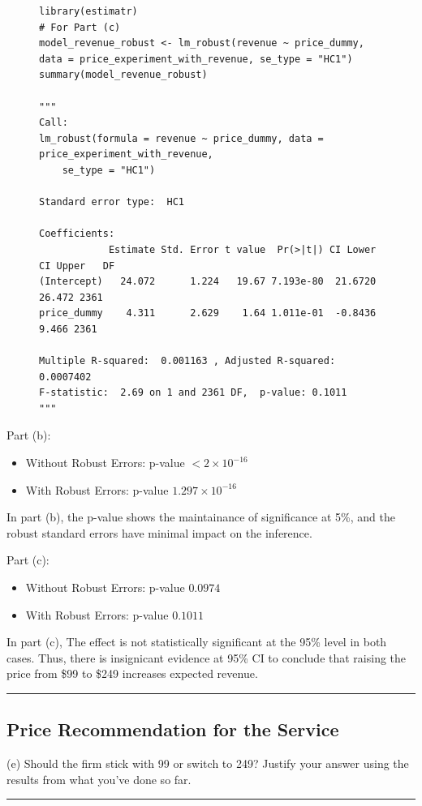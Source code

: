\documentclass{article}
\newenvironment{colorparagraph}[1]{\par\color{#1}}{\par}
\begin{document}
\begin{figure}[H]
\centering
\begin{lstlisting}[style=Rstyle, caption=Simple Revenue Dummy Regression on Price Experiment with Robust Errors]
    library(estimatr)
# For Part (c)
model_revenue_robust <- lm_robust(revenue ~ price_dummy, data = price_experiment_with_revenue, se_type = "HC1")
summary(model_revenue_robust)

"""
Call:
lm_robust(formula = revenue ~ price_dummy, data = price_experiment_with_revenue, 
    se_type = "HC1")

Standard error type:  HC1 

Coefficients:
            Estimate Std. Error t value  Pr(>|t|) CI Lower CI Upper   DF
(Intercept)   24.072      1.224   19.67 7.193e-80  21.6720   26.472 2361
price_dummy    4.311      2.629    1.64 1.011e-01  -0.8436    9.466 2361

Multiple R-squared:  0.001163 ,	Adjusted R-squared:  0.0007402 
F-statistic:  2.69 on 1 and 2361 DF,  p-value: 0.1011
"""
\end{lstlisting}
\end{figure}

Part (b):
\begin{itemize}
    \item Without Robust Errors: p-value $< 2 \times 10^{-16}$
    \item With Robust Errors: p-value $1.297 \times 10^{-16}$
\end{itemize}

In part (b), the p-value shows the maintainance of significance at 5\%, and the robust standard errors have minimal impact on the inference.

Part (c):
\begin{itemize}
    \item Without Robust Errors: p-value $0.0974$
    \item With Robust Errors: p-value $0.1011$
\end{itemize}

In part (c), The effect is not statistically significant at the 95\% level in both cases. Thus, there is insignicant evidence at 95\% CI to conclude that raising the price from \$99 to \$249 increases expected revenue.

\begin{colorparagraph}{questioncolor}
\rule{\textwidth}{0.5pt}

\label{q3e}\subsection{Price Recommendation for the Service}
(e) Should the firm stick with 99 or switch to 249? Justify your answer using the results from what you've done so far.

\rule{\textwidth}{0.5pt}
\end{colorparagraph}
\end{document}
